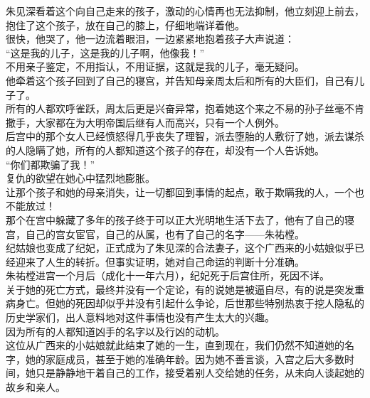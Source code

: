\begin{multicols}{\theparacolNo}
朱见深看着这个向自己走来的孩子，激动的心情再也无法抑制，他立刻迎上前去，抱住了这个孩子，放在自己的膝上，仔细地端详着他。\\

很快，他哭了，他一边流着眼泪，一边紧紧地抱着孩子大声说道：\\

“这是我的儿子，这是我的儿子啊，他像我！”\\

不用亲子鉴定，不用指认，不用证据，这就是我的儿子，毫无疑问。\\

他牵着这个孩子回到了自己的寝宫，并告知母亲周太后和所有的大臣们，自己有儿子了。\\

所有的人都欢呼雀跃，周太后更是兴奋异常，抱着她这个来之不易的孙子丝毫不肯撒手，大家都在为大明帝国后继有人而高兴，只有一个人例外。\\

后宫中的那个女人已经愤怒得几乎丧失了理智，派去堕胎的人敷衍了她，派去谋杀的人隐瞒了她，所有的人都知道这个孩子的存在，却没有一个人告诉她。\\

“你们都欺骗了我！”\\

复仇的欲望在她心中猛烈地膨胀。\\

让那个孩子和她的母亲消失，让一切都回到事情的起点，敢于欺瞒我的人，一个也不能放过！\\

那个在宫中躲藏了多年的孩子终于可以正大光明地生活下去了，他有了自己的寝宫，自己的宫女宦官，自己的从属，也有了自己的名字——朱祐樘。\\

纪姑娘也变成了纪妃，正式成为了朱见深的合法妻子，这个广西来的小姑娘似乎已经迎来了人生的转折。但事实证明，她对自己命运的判断十分准确。\\

朱祐樘进宫一个月后（成化十一年六月），纪妃死于后宫住所，死因不详。\\

关于她的死亡方式，最终并没有一个定论，有的说她是被逼自尽，有的说是突发重病身亡。但她的死因却似乎并没有引起什么争论，后世那些特别热衷于挖人隐私的历史学家们，出人意料地对这件事情也没有产生太大的兴趣。\\

因为所有的人都知道凶手的名字以及行凶的动机。\\

这位从广西来的小姑娘就此结束了她的一生，直到现在，我们仍然不知道她的名字，她的家庭成员，甚至于她的准确年龄。因为她不善言谈，入宫之后大多数时间，她只是静静地干着自己的工作，接受着别人交给她的任务，从未向人谈起她的故乡和亲人。\\


\end{multicols}
